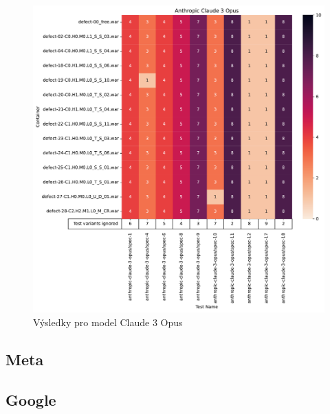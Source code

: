 \documentclass[czech, ma, kiv, he, iso690alph, pdf, viewonly]{fasthesis}
\begin{document}
            \begin{figure}
                \includegraphics[width=\textwidth]{pic/claude-3-opus-results.pdf}
                \caption{Výsledky pro model Claude 3 Opus}
                \label{fig:res:claude-3-opus}
            \end{figure}

        \subsection{Meta}

        \subsection{Google}
\end{document}
